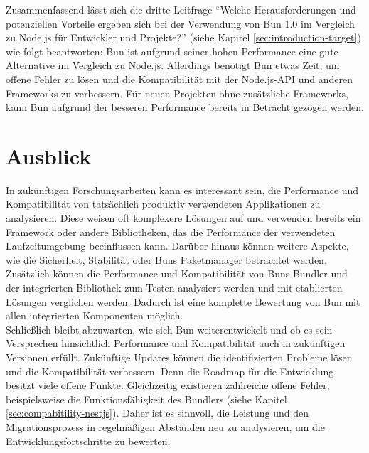 \noindent
Zusammenfassend lässt sich die dritte Leitfrage ``Welche Herausforderungen und potenziellen Vorteile ergeben sich bei der Verwendung von Bun 1.0 im Vergleich zu Node.js für Entwickler und Projekte?'' (siehe Kapitel \ref{sec:introduction-target}) wie folgt beantworten: Bun ist aufgrund seiner hohen Performance eine gute Alternative im Vergleich zu Node.js. Allerdings benötigt Bun etwas Zeit, um offene Fehler zu lösen und die Kompatibilität mit der Node.js-API und anderen Frameworks zu verbessern. Für neuen Projekten ohne zusätzliche Frameworks, kann Bun aufgrund der besseren Performance bereits in Betracht gezogen werden.


\section{Ausblick} \label{sec:finalThoughts-outlook}
In zukünftigen Forschungsarbeiten kann es interessant sein, die Performance und Kompatibilität von tatsächlich produktiv verwendeten Applikationen zu analysieren. Diese weisen oft komplexere Lösungen auf und verwenden bereits ein Framework oder andere Bibliotheken, das die Performance der verwendeten Laufzeitumgebung beeinflussen kann. Darüber hinaus können weitere Aspekte, wie die Sicherheit, Stabilität oder Buns Paketmanager betrachtet werden. Zusätzlich können die Performance und Kompatibilität von Buns Bundler und der integrierten Bibliothek zum Testen analysiert werden und mit etablierten Lösungen verglichen werden. Dadurch ist eine komplette Bewertung von Bun mit allen integrierten Komponenten möglich.\\

\noindent
Schließlich bleibt abzuwarten, wie sich Bun weiterentwickelt und ob es sein Versprechen hinsichtlich Performance und Kompatibilität auch in zukünftigen Versionen erfüllt. Zukünftige Updates können die identifizierten Probleme lösen und die Kompatibilität verbessern. Denn die Roadmap für die Entwicklung besitzt viele offene Punkte. Gleichzeitig existieren zahlreiche offene Fehler, beispielsweise die Funktionsfähigkeit des Bundlers (siehe Kapitel \ref{sec:compabitility-nestjs}). Daher ist es sinnvoll, die Leistung und den Migrationsprozess in regelmäßigen Abständen neu zu analysieren, um die Entwicklungsfortschritte zu bewerten.
